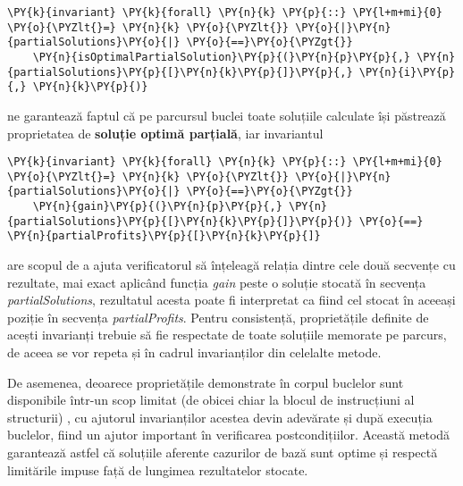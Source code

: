 \begin{sloppypar}
    \begin{Verbatim}[commandchars=\\\{\}]
\PY{k}{invariant} \PY{k}{forall} \PY{n}{k} \PY{p}{::} \PY{l+m+mi}{0} \PY{o}{\PYZlt{}=} \PY{n}{k} \PY{o}{\PYZlt{}} \PY{o}{|}\PY{n}{partialSolutions}\PY{o}{|} \PY{o}{==}\PY{o}{\PYZgt{}} 
    \PY{n}{isOptimalPartialSolution}\PY{p}{(}\PY{n}{p}\PY{p}{,} \PY{n}{partialSolutions}\PY{p}{[}\PY{n}{k}\PY{p}{]}\PY{p}{,} \PY{n}{i}\PY{p}{,} \PY{n}{k}\PY{p}{)}
\end{Verbatim}
    ne garantează faptul că pe parcursul buclei toate soluțiile calculate își păstrează proprietatea de \textbf{soluție optimă parțială}, iar invariantul 
    \begin{Verbatim}[commandchars=\\\{\}]
\PY{k}{invariant} \PY{k}{forall} \PY{n}{k} \PY{p}{::} \PY{l+m+mi}{0} \PY{o}{\PYZlt{}=} \PY{n}{k} \PY{o}{\PYZlt{}} \PY{o}{|}\PY{n}{partialSolutions}\PY{o}{|} \PY{o}{==}\PY{o}{\PYZgt{}} 
    \PY{n}{gain}\PY{p}{(}\PY{n}{p}\PY{p}{,} \PY{n}{partialSolutions}\PY{p}{[}\PY{n}{k}\PY{p}{]}\PY{p}{)} \PY{o}{==} \PY{n}{partialProfits}\PY{p}{[}\PY{n}{k}\PY{p}{]}
\end{Verbatim}
    are scopul de a ajuta verificatorul să înțeleagă relația dintre cele două secvențe cu rezultate, mai exact aplicând funcția \textit{gain} peste o soluție stocată în secvența \textit{partialSolutions}, rezultatul acesta poate fi interpretat ca fiind cel stocat în aceeași poziție în secvența \textit{partialProfits}. Pentru consistență, proprietățile definite de acești invarianți trebuie să fie respectate de toate soluțiile memorate pe parcurs, de aceea se vor repeta și în cadrul invarianților din celelalte metode.
    \par De asemenea, deoarece proprietățile demonstrate în corpul buclelor sunt disponibile într-un scop limitat (de obicei chiar la blocul de instrucțiuni al structurii) \cite{verification_optimization}, cu ajutorul invarianților acestea devin adevărate și după execuția buclelor, fiind un ajutor important în verificarea postcondițiilor. Această metodă garantează astfel că soluțiile aferente cazurilor de bază sunt optime și respectă limitările impuse față de lungimea rezultatelor stocate. \\ \par


\end{sloppypar}
